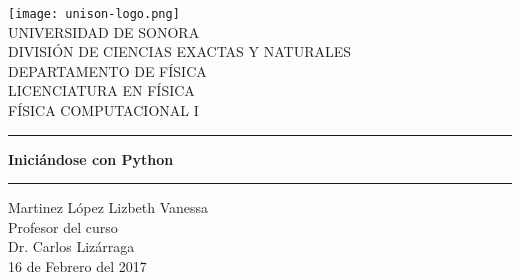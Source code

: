 \documentclass[12pt]{article}
\begin{document}
\begin{center}
\texttt{[image: unison-logo.png]}
\\
\vspace{0.5cm}
UNIVERSIDAD DE SONORA \\
\vspace{0.5cm}
DIVISIÓN DE CIENCIAS EXACTAS Y NATURALES \\
\vspace{0.5cm}
DEPARTAMENTO DE FÍSICA\\
\vspace{0.5cm}
LICENCIATURA EN FÍSICA\\
\vspace{0.5cm}
FÍSICA COMPUTACIONAL I

\vspace{2 cm}
\hrule
\vspace{1 cm}

{\huge \bfseries {Iniciándose con Python}}

\vspace{1 cm}
\hrule
\vspace{2 cm}
Martinez López Lizbeth Vanessa \\ 
\vspace{1 cm}
Profesor del curso\\
Dr. Carlos Lizárraga\\
\vspace{2 cm}
16 de Febrero del 2017
\end{center}
\pagebreak
\end{document}
